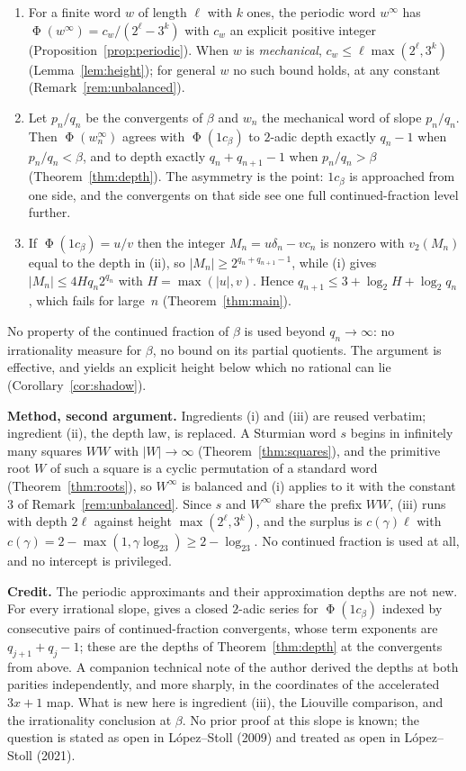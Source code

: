 \documentclass[11pt,reqno]{amsart}
\theoremstyle{plain}
\theoremstyle{definition}
\newcommand{\vt}{v_2}
\DeclareMathOperator{\Ph}{\Phi}
\begin{document}
\begin{enumerate}
\item[(i)] For a finite word $w$ of length $\ell$ with $k$ ones, the periodic
word $w^\infty$ has $\Ph(w^\infty)=c_w/(2^{\ell}-3^{k})$ with $c_w$ an explicit
positive integer (Proposition~\ref{prop:periodic}). When $w$ is
\emph{mechanical}, $c_w\le \ell\max(2^\ell,3^k)$
(Lemma~\ref{lem:height}); for general $w$ no such bound holds, at any constant
(Remark~\ref{rem:unbalanced}).
\item[(ii)] Let $p_n/q_n$ be the convergents of $\beta$ and $w_n$ the mechanical
word of slope $p_n/q_n$. Then $\Ph(w_n^\infty)$ agrees with $\Ph(1c_\beta)$ to
$2$-adic depth exactly $q_n-1$ when $p_n/q_n<\beta$, and to depth exactly
$q_n+q_{n+1}-1$ when $p_n/q_n>\beta$ (Theorem~\ref{thm:depth}). The asymmetry is
the point: $1c_\beta$ is approached from one side, and the convergents on that
side see one full continued-fraction level further.
\item[(iii)] If $\Ph(1c_\beta)=u/v$ then the integer $M_n=u\delta_n-vc_n$ is
nonzero with $\vt(M_n)$ equal to the depth in (ii), so $|M_n|\ge 2^{q_n+q_{n+1}-1}$,
while (i) gives $|M_n|\le 4Hq_n2^{q_n}$ with $H=\max(|u|,v)$. Hence
$q_{n+1}\le 3+\log_2H+\log_2q_n$, which fails for large~$n$
(Theorem~\ref{thm:main}).
\end{enumerate}

No property of the continued fraction of $\beta$ is used beyond $q_n\to\infty$:
no irrationality measure for $\beta$, no bound on its partial quotients. The
argument is effective, and yields an explicit height below which no rational can
lie (Corollary~\ref{cor:shadow}).

\medskip
\noindent\textbf{Method, second argument.} Ingredients (i) and (iii) are reused
verbatim; ingredient (ii), the depth law, is replaced. A Sturmian word $s$
begins in infinitely many squares $WW$ with $|W|\to\infty$
(Theorem~\ref{thm:squares}), and the primitive root $W$ of such a square is a
cyclic permutation of a standard word (Theorem~\ref{thm:roots}), so
$W^{\infty}$ is balanced and (i) applies to it with the constant $3$ of
Remark~\ref{rem:unbalanced}. Since $s$ and $W^{\infty}$ share the prefix $WW$,
(iii) runs with depth $2\ell$ against height $\max(2^{\ell},3^{k})$, and the
surplus is $c(\gamma)\ell$ with $c(\gamma)=2-\max(1,\gamma\log_23)\ge2-\log_23$.
No continued fraction is used at all, and no intercept is privileged.

\medskip
\noindent\textbf{Credit.} The periodic approximants and their approximation
depths are not new. For every irrational slope, \cite[Theorem~1]{LopezStoll2009}
gives a closed $2$-adic series for $\Ph(1c_\beta)$ indexed by consecutive pairs
of continued-fraction convergents, whose term exponents are $q_{j+1}+q_j-1$;
these are the depths of Theorem~\ref{thm:depth} at the convergents from above.
A companion technical note of the author \cite{DeJesusA} derived the depths at
both parities independently, and more sharply, in the coordinates of the
accelerated $3x+1$ map. What is new here is ingredient (iii), the Liouville
comparison, and the irrationality conclusion at $\beta$. No prior proof at this
slope is known; the question is stated as open in L\'opez--Stoll (2009) and
treated as open in L\'opez--Stoll (2021).
\end{document}
